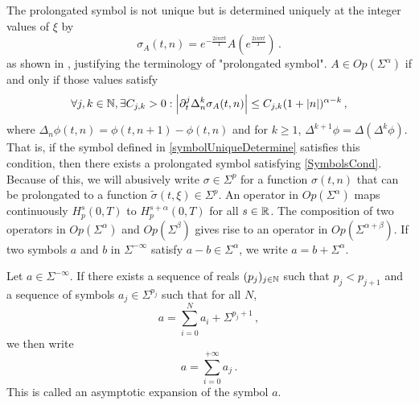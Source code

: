 \documentclass[a4paper]{article}
\begin{document}
The prolongated symbol is not unique but is determined uniquely at the integer values of $\xi$ by 
\begin{equation}
	\label{symbolUniqueDetermine}
	\sigma_A(t,n) =  e^{-\frac{2in\pi t}{T}}A(e^{\frac{2in\pi t}{T}})\,.
\end{equation}
as shown in \cite{thrunen1998symbol}, justifying the terminology of "prolongated symbol". $A \in \textit{Op}(\Sigma^\alpha)$ if and only if those values satisfy 
\[\forall j,k \in \mathbb{N}, \exists C_{j,k} > 0 : \left\lvert \partial_t^j \Delta_n^k \sigma_A(t,n) \right\rvert \leq C_{j,k}(1 + \left\lvert n \right\rvert)^{\alpha - k}\,,\] 
where $\Delta_n \phi(t,n) = \phi(t,n+1) - \phi(t,n)$ and for $k \geq 1$, $\Delta^{k+1}\phi = \Delta (\Delta^k \phi)$. That is, if the symbol defined in \eqref{symbolUniqueDetermine} satisfies this condition, then there exists a prolongated symbol satisfying \eqref{SymbolsCond}. Because of this, we will abusively write $\sigma \in \Sigma^p$ for a function $\sigma(t,n)$ that can be prolongated to a function $\tilde{\sigma}(t,\xi) \in \Sigma^p$. An operator in $\textit{Op}(\Sigma^\alpha)$ maps continuously $H_p^s(0,T)$ to $H_p^{s + \alpha}(0,T)$ for all $s \in \mathbb{R}$. The composition of two operators in $\textit{Op}(\Sigma^\alpha)$ and $\textit{Op}(\Sigma^\beta)$ gives rise to an operator in $\textit{Op}(\Sigma^{\alpha+\beta})$. 
If two symbols $a$ and $b$ in $\Sigma^{- \infty}$ satisfy $a - b  \in \Sigma^{\alpha}$, we write $a = b + \Sigma^\alpha$. 
\begin{Def}
	Let $a \in \Sigma^{- \infty}$. If there exists a sequence of reals $(p_j)_{j \in \mathbb{N}}$ such that $p_j < p_{j+1}$ and a sequence of symbols $a_j \in \Sigma^{p_j}$ such that for all $N$, 
	\[a = \sum_{i = 0}^{N}a_i + \Sigma^{p_j + 1}\,,\]
	we then write 
	\[a = \sum_{i = 0}^{+ \infty} a_j \,.\]
	This is called an asymptotic expansion of the symbol $a$. 
\end{Def}
\end{document}
